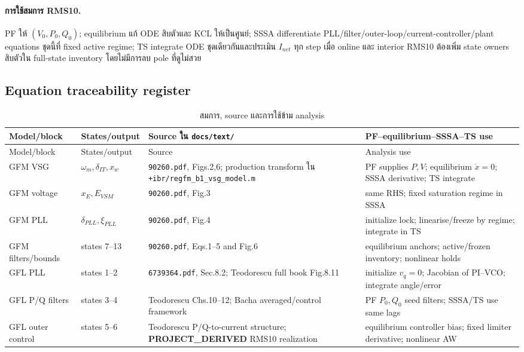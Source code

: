 \documentclass[12pt,a4paper]{article}
\newcommand{\derived}{\textcolor{teal!70!black}{\textbf{PROJECT\_DERIVED}}}
\begin{document}
\paragraph{การใช้สมการ RMS10.}
PF ให้ $(V_0,P_0,Q_0)$; equilibrium แก้ ODE สิบตัวและ KCL ให้เป็นศูนย์;
SSSA differentiate PLL/filter/outer-loop/current-controller/plant equations ชุดนี้ที่
fixed active regime; TS integrate ODE ชุดเดียวกันและประเมิน $I_{net}$ ทุก step
เมื่อ online และ interior RMS10 ต้องเพิ่ม state owners สิบตัวใน full-state inventory
โดยไม่มีการลบ pole ที่ดูไม่สวย

\subsection{Equation traceability register}

\begin{longtable}{p{}p{}p{}p{}}
\caption{สมการ, source และการใช้ข้าม analysis}\label{tab:equation-trace}\\
\toprule
Model/block & States/output & Source ใน \nolinkurl{docs/text/} & PF--equilibrium--SSSA--TS use \\\midrule
\endfirsthead
\toprule Model/block & States/output & Source & Analysis use \\\midrule
\endhead
GFM VSG & $\omega_m,\delta_{IT},x_w$ & \nolinkurl{90260.pdf}, Figs.2,6; production transform ใน \nolinkurl{+ibr/regfm_b1_vsg_model.m} & PF supplies $P,V$; equilibrium $\dot x=0$; SSSA derivative; TS integrate \\
GFM voltage & $x_E,E_{VSM}$ & \nolinkurl{90260.pdf}, Fig.3 & same RHS; fixed saturation regime in SSSA \\
GFM PLL & $\delta_{PLL},\xi_{PLL}$ & \nolinkurl{90260.pdf}, Fig.4 & initialize lock; linearise/freeze by regime; integrate in TS \\
GFM filters/bounds & states 7--13 & \nolinkurl{90260.pdf}, Eqs.1--5 and Fig.6 & equilibrium anchors; active/frozen inventory; nonlinear holds \\
GFL PLL & states 1--2 & \nolinkurl{6739364.pdf}, Sec.8.2; Teodorescu full book Fig.8.11 & initialize $v_q=0$; Jacobian of PI--VCO; integrate angle/error \\
GFL P/Q filters & states 3--4 & Teodorescu Chs.10--12; Bacha averaged/control framework & PF $P_0,Q_0$ seed filters; SSSA/TS use same lags \\
GFL outer control & states 5--6 & Teodorescu P/Q-to-current structure; \derived{} RMS10 realization & equilibrium controller bias; fixed limiter derivative; nonlinear AW \\

\end{longtable}
\end{document}
